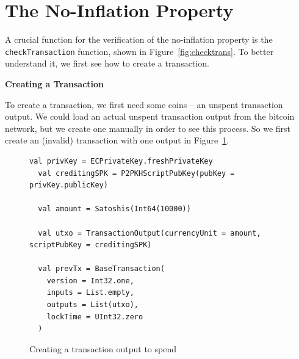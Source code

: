 \documentclass[runningheads]{llncs}
\renewcommand{\paragraph}{\textbf}%
\begin{document}
\section{The No-Inflation Property}

A crucial function for the verification of the no-inflation property
is the \texttt{checkTransaction} function, shown in
Figure~\ref{fig:checktrans}. To better understand it, we first see how
to create a transaction.

\paragraph{Creating a Transaction}




To create a transaction, we first need some coins -- an unspent
transaction output. We could load an actual unspent transaction output
from the bitcoin network, but we create one manually in order to see
this process. So we first create an (invalid) transaction with one
output in Figure~\ref{fig:prevtx}.

\begin{figure}
\begin{lstlisting}[style=scala]
  val privKey = ECPrivateKey.freshPrivateKey
  val creditingSPK = P2PKHScriptPubKey(pubKey = privKey.publicKey)

  val amount = Satoshis(Int64(10000))

  val utxo = TransactionOutput(currencyUnit = amount, scriptPubKey = creditingSPK)

  val prevTx = BaseTransaction(
    version = Int32.one,
    inputs = List.empty,
    outputs = List(utxo),
    lockTime = UInt32.zero
  )
\end{lstlisting}
  
  \caption{Creating a transaction output to spend}
  \label{fig:prevtx}
\end{figure}
\end{document}
